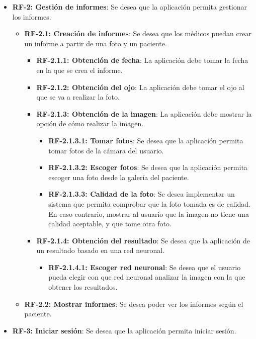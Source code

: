 \begin{itemize}
    \item \textbf{RF-2: Gestión de informes}: Se desea que la aplicación permita gestionar los informes.
        \begin{itemize}
            \item \textbf{RF-2.1: Creación de informes}: Se desea que los médicos puedan crear un informe a partir de una foto y un paciente.
            \begin{itemize}
                \item \textbf{RF-2.1.1: Obtención de fecha}: La aplicación debe tomar la fecha en la que se crea el informe.
                \item \textbf{RF-2.1.2: Obtención del ojo}: La aplicación debe tomar el ojo al que se va a realizar la foto.
                \item \textbf{RF-2.1.3: Obtención de la imagen}: La aplicación debe mostrar la opción de cómo realizar la imagen.
                \begin{itemize}
                        \item \textbf{RF-2.1.3.1: Tomar fotos}: Se desea que la aplicación permita tomar fotos de la cámara del usuario.
                        \item \textbf{RF-2.1.3.2: Escoger fotos}: Se desea que la aplicación permita escoger una foto desde la galería del paciente.
                        \item \textbf{RF-2.1.3.3: Calidad de la foto}: Se desea implementar un sistema que permita comprobar que la foto tomada es de calidad. En caso contrario, mostrar al usuario que la imagen no tiene una calidad aceptable, y que tome otra foto.
                \end{itemize}
                \item \textbf{RF-2.1.4: Obtención del resultado}: Se desea que la aplicación de un resultado basado en una red neuronal.
                \begin{itemize}
                    \item \textbf{RF-2.1.4.1: Escoger red neuronal}: Se desea que el usuario pueda elegir con que red neuronal analizar la imagen con la que obtener los resultados.
                \end{itemize}
            \end{itemize}
            \item \textbf{RF-2.2: Mostrar informes}: Se desea poder ver los informes según el paciente.
        \end{itemize}
    \item \textbf{RF-3: Iniciar sesión}: Se desea que la aplicación permita iniciar sesión.  

\end{itemize}
